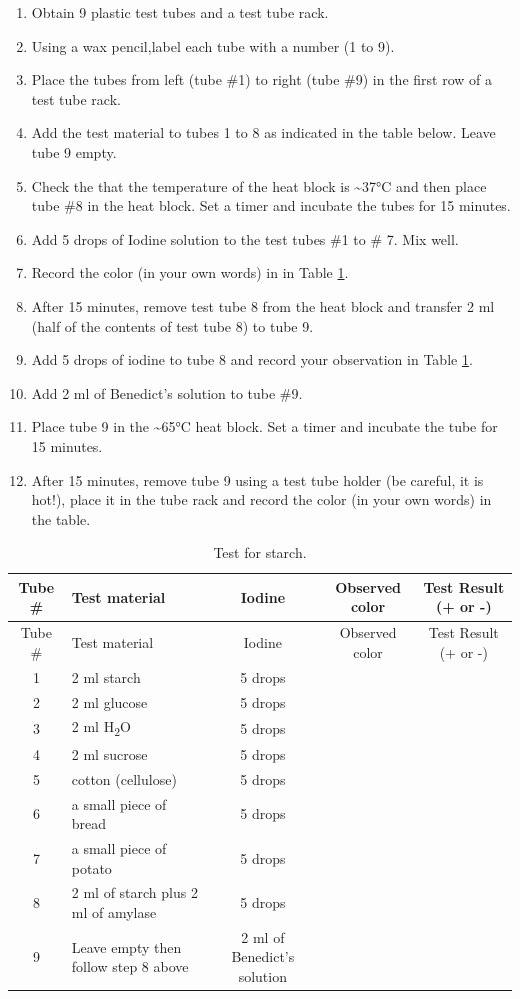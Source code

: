 \begin{enumerate}
\def\labelenumi{\arabic{enumi}.}
\tightlist
\item
  Obtain 9 plastic test tubes and a test tube rack.
\item
  Using a wax pencil,label each tube with a number (1 to 9).
\item
  Place the tubes from left (tube \#1) to right (tube \#9) in the first
  row of a test tube rack.
\item
  Add the test material to tubes 1 to 8 as indicated in the table below.
  Leave tube 9 empty.
\item
  Check the that the temperature of the heat block is
  \textasciitilde{}37°C and then place tube \#8 in the heat block. Set a
  timer and incubate the tubes for 15 minutes.
\item
  Add 5 drops of Iodine solution to the test tubes \#1 to \# 7. Mix
  well.
\item
  Record the color (in your own words) in in Table \ref{tab:starch}.
\item
  After 15 minutes, remove test tube 8 from the heat block and transfer
  2 ml (half of the contents of test tube 8) to tube 9.
\item
  Add 5 drops of iodine to tube 8 and record your observation in Table
  \ref{tab:starch}.
\item
  Add 2 ml of Benedict's solution to tube \#9.
\item
  Place tube 9 in the \textasciitilde{}65°C heat block. Set a timer and
  incubate the tube for 15 minutes.
\item
  After 15 minutes, remove tube 9 using a test tube holder (be careful,
  it is hot!), place it in the tube rack and record the color (in your
  own words) in the table.
\end{enumerate}

\begin{longtable}[]{@{}clccc@{}}
\caption{\label{tab:starch} Test for starch.}\tabularnewline
\toprule
Tube \# & Test material & Iodine & Observed color & Test Result (+ or
-)\tabularnewline
\midrule
\endfirsthead
\toprule
Tube \# & Test material & Iodine & Observed color & Test Result (+ or
-)\tabularnewline
\midrule
\endhead
1 & 2 ml starch & 5 drops & &\tabularnewline
2 & 2 ml glucose & 5 drops & &\tabularnewline
3 & 2 ml H\textsubscript{2}O & 5 drops & &\tabularnewline
4 & 2 ml sucrose & 5 drops & &\tabularnewline
5 & cotton (cellulose) & 5 drops & &\tabularnewline
6 & a small piece of bread & 5 drops & &\tabularnewline
7 & a small piece of potato & 5 drops & &\tabularnewline
8 & 2 ml of starch plus 2 ml of amylase & 5 drops & &\tabularnewline
9 & Leave empty then follow step 8 above & 2 ml of Benedict's solution &
&\tabularnewline
\bottomrule
\end{longtable}

